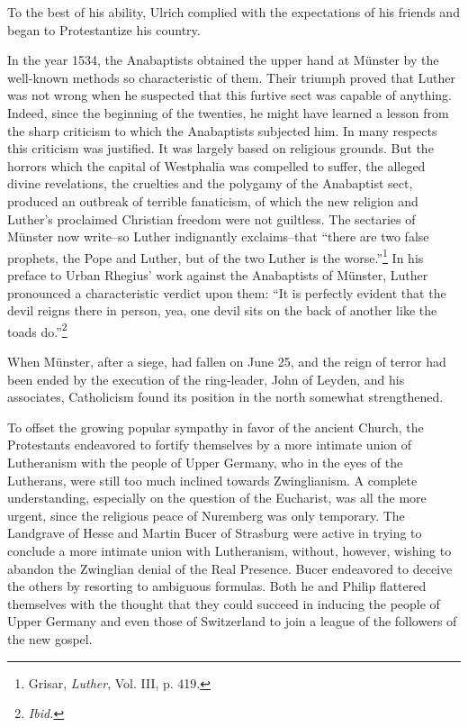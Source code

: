 To the best of his ability, Ulrich complied with the expectations of
his friends and began to Protestantize his country.

In the year 1534, the Anabaptists obtained the upper hand at
Münster by the well-known methods so characteristic of them. Their
triumph proved that Luther was not wrong when he suspected that
this furtive sect was capable of anything. Indeed, since the beginning
of the twenties, he might have learned a lesson from the sharp
criticism to which the Anabaptists subjected him. In many respects
this criticism was justified. It was largely based on religious grounds.
But the horrors which the capital of Westphalia was compelled to
suffer, the alleged divine revelations, the cruelties and the polygamy
of the Anabaptist sect, produced an outbreak of terrible fanaticism,
of which the new religion and Luther’s proclaimed Christian freedom
were not guiltless. The sectaries of Münster now write--so Luther
indignantly exclaims--that “there are two false prophets, the Pope
and Luther, but of the two Luther is the worse.”\footnote{Grisar, \textit{Luther}, Vol. III, p. 419.}
 In his preface to
Urban Rhegius’ work against the Anabaptists of Münster, Luther
pronounced a characteristic verdict upon them: “It is perfectly
evident that the devil reigns there in person, yea, one devil sits on
the back of another like the toads do.”\footnote{\textit{Ibid.}}


When Münster, after a siege, had fallen on June 25, and the reign
of terror had been ended by the execution of the ring-leader, John
of Leyden, and his associates, Catholicism found its position in the
north somewhat strengthened.

To offset the growing popular sympathy in favor of the ancient
Church, the Protestants endeavored to fortify themselves by a more
intimate union of Lutheranism with the people of Upper Germany,
who in the eyes of the Lutherans, were still too much inclined towards
Zwinglianism. A complete understanding, especially on the question
of the Eucharist, was all the more urgent, since the religious peace
of Nuremberg was only temporary. The Landgrave of Hesse and
Martin Bucer of Strasburg were active in trying to conclude a more
intimate union with Lutheranism, without, however, wishing to abandon
the Zwinglian denial of the Real Presence. Bucer endeavored
to deceive the others by resorting to ambiguous formulas. Both he
and Philip flattered themselves with the thought that they could succeed
in inducing the people of Upper Germany and even those of
Switzerland to join a league of the followers of the new gospel.

